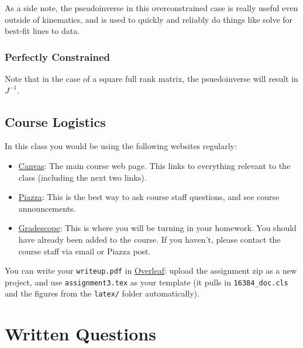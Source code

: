 \documentclass{16384_doc}
\begin{document}
As a side note, the pseudoinverse in this overconstrained case is really useful
even outside of kinematics, and is used to quickly and reliably do things like
solve for best-fit lines to data.

\subsubsection{Perfectly Constrained}
Note that in the case of a square full rank matrix, the psuedoinverse will
result in $J^{-1}$.

\subsection{Course Logistics}

In this class you would be using the following websites regularly:
\begin{itemize}
    \item \href{https://canvas.cmu.edu/courses/56566}{Canvas}: The main course web page. This links to everything relevant to the class (including the next two links).
    \item \href{https://piazza.com/class/mt8vtez94dv38b}{Piazza}: This is the best way to ask course staff questions, and see course announcements.
    \item \href{https://www.gradescope.com/courses/1369131}{Gradescope}: This is where you will be turning in your homework. You should have already been added to the course. If you haven't, please contact the course staff via email or Piazza post.
\end{itemize}

You can write your \verb!writeup.pdf! in \href{https://www.overleaf.com/}{Overleaf}: upload the assignment zip as a new project, and use \verb!assignment3.tex! as your template (it pulls in \verb!16384_doc.cls! and the figures from the \verb!latex/! folder automatically).

\writtenSection

\section{Written Questions}
\end{document}
